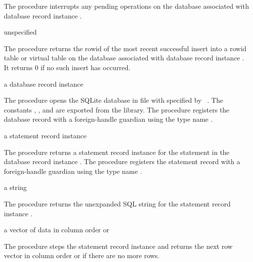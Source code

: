 The  procedure interrupts any pending
operations on the database associated with database record instance
.

\begin{procedure}
\end{procedure}
\returns{} unspecified

The  procedure returns the rowid of the
most recent successful insert into a rowid table or virtual table on
the database associated with database record instance . It
returns 0 if no such insert has occurred.

\begin{procedure}
\end{procedure}
\returns{} a database record instance

The  procedure opens the SQLite database in file
 with  specified by
~\cite{sqlite}. The constants
, , and
 are exported from the 
library.
The  procedure registers the database record
with a foreign-handle guardian using the type name .

\begin{procedure}
\end{procedure}
\returns{} a statement record instance

The  procedure returns a statement record
instance for the  statement in the database record instance
.
The  procedure registers the statement record
with a foreign-handle guardian using the type name .

\begin{procedure}
\end{procedure}
\returns{} a string

The  procedure returns the unexpanded SQL string for
the statement record instance .

\begin{procedure}
\end{procedure}
\returns{} a vector of data in column order or 

The  procedure steps the statement record instance
 and returns the next row vector in column order or
 if there are no more rows.
